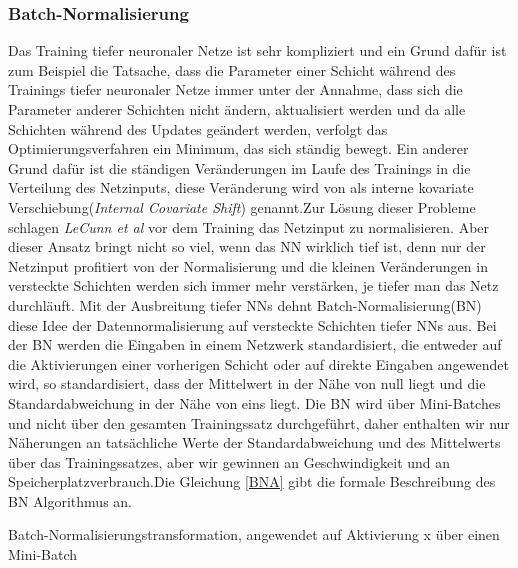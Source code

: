 \documentclass[12pt,a4paper]{scrartcl}
\numberwithin{equation}{section}
\begin{document}
\subsubsection{Batch-Normalisierung}\label{Batch-Normalisierung}
Das Training tiefer neuronaler Netze ist sehr kompliziert und ein Grund dafür ist zum Beispiel die Tatsache, dass die Parameter einer Schicht während des Trainings tiefer neuronaler Netze immer unter der Annahme, dass sich die Parameter anderer Schichten nicht ändern, aktualisiert werden und da alle Schichten während des Updates geändert werden, verfolgt das Optimierungsverfahren ein Minimum, das sich ständig bewegt. Ein anderer Grund dafür ist die ständigen Veränderungen im Laufe des Trainings in die Verteilung des Netzinputs, diese Veränderung wird von \cite{bactchnormalisation} als interne kovariate Verschiebung(\textit{Internal Covariate Shift}) genannt.Zur Lösung dieser Probleme schlagen \textit{LeCunn et al}\cite{LeCun} vor dem Training das Netzinput zu normalisieren. Aber dieser Ansatz bringt nicht so viel, wenn das \ac{NN} wirklich tief ist, denn nur der Netzinput profitiert von der Normalisierung und die kleinen Veränderungen in versteckte Schichten werden sich immer mehr verstärken, je tiefer man das Netz durchläuft. Mit der Ausbreitung tiefer \acsp{NN} dehnt Batch-Normalisierung(BN)\cite{bactchnormalisation} diese Idee der Datennormalisierung auf versteckte Schichten tiefer \acsp{NN} aus. Bei der BN werden die Eingaben in einem Netzwerk standardisiert, die entweder auf die Aktivierungen einer vorherigen Schicht oder auf direkte Eingaben angewendet wird, so standardisiert, dass der Mittelwert in der Nähe von null liegt und die Standardabweichung in der Nähe von eins liegt. Die BN wird über Mini-Batches und nicht über den gesamten Trainingssatz durchgeführt, daher enthalten wir nur Näherungen an tatsächliche Werte der Standardabweichung und des Mittelwerts über das Trainingssatzes, aber wir gewinnen an Geschwindigkeit und an Speicherplatzverbrauch.Die Gleichung \eqref{BNA} gibt die formale Beschreibung des BN Algorithmus an.
\begin{center}
	 Batch-Normalisierungstransformation, angewendet auf Aktivierung x über einen Mini-Batch
\end{center}
\end{document}
